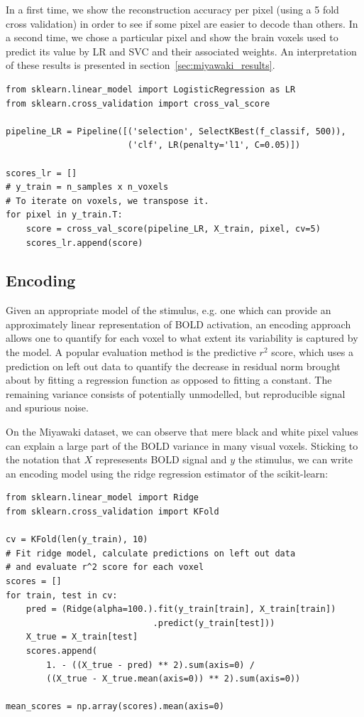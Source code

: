 \documentclass{frontiersSCNS} %
\begin{document}
In a first time, we show the reconstruction accuracy per pixel (using a 5 fold
cross validation) in order to see if some pixel are easier to decode than
others.
In a second time, we chose a particular pixel and show the brain voxels used to
predict its value by LR and SVC and their associated weights. An interpretation
of these results is presented in section~\ref{sec:miyawaki_results}.


\begin{lstlisting}
from sklearn.linear_model import LogisticRegression as LR
from sklearn.cross_validation import cross_val_score

pipeline_LR = Pipeline([('selection', SelectKBest(f_classif, 500)),
                        ('clf', LR(penalty='l1', C=0.05)])

scores_lr = []
# y_train = n_samples x n_voxels
# To iterate on voxels, we transpose it.
for pixel in y_train.T:
    score = cross_val_score(pipeline_LR, X_train, pixel, cv=5)
    scores_lr.append(score)
\end{lstlisting}




\subsection{Encoding}
Given an appropriate model of the stimulus, e.g. one which can provide an
approximately linear representation of BOLD activation, an encoding approach
allows one to quantify for each voxel to what extent its variability is captured
by the model. A popular evaluation method is the predictive \(r^2\) score, which
uses a prediction on left out data to quantify the decrease in residual norm 
brought about by fitting a regression function as opposed to fitting a constant. 
The remaining variance consists of potentially unmodelled, but reproducible signal
and spurious noise.

On the Miyawaki dataset, we can observe that mere black and white pixel values
can explain a large part of the BOLD variance in many visual voxels. Sticking
to the notation that \(X\) represesents BOLD signal and \(y\) the stimulus, we
can write an encoding model using the ridge regression estimator of the scikit-learn:

\begin{lstlisting}
from sklearn.linear_model import Ridge
from sklearn.cross_validation import KFold

cv = KFold(len(y_train), 10)
# Fit ridge model, calculate predictions on left out data
# and evaluate r^2 score for each voxel
scores = []
for train, test in cv:
    pred = (Ridge(alpha=100.).fit(y_train[train], X_train[train])
                             .predict(y_train[test]))
    X_true = X_train[test]
    scores.append(
        1. - ((X_true - pred) ** 2).sum(axis=0) /
        ((X_true - X_true.mean(axis=0)) ** 2).sum(axis=0))
    
mean_scores = np.array(scores).mean(axis=0)
\end{lstlisting}
\end{document}
